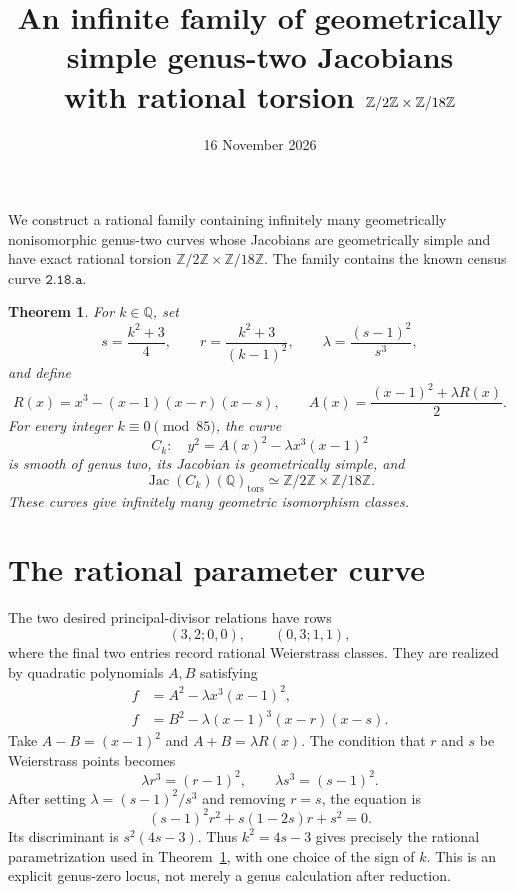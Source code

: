 \documentclass[11pt]{article}
\title{An infinite family of geometrically simple genus-two Jacobians\\
with rational torsion $\Z/2\Z\times\Z/18\Z$}
\author{}
\date{16 November 2026}
\newcommand{\Q}{\mathbb Q}
\newcommand{\Z}{\mathbb Z}
\newcommand{\Jac}{\operatorname{Jac}}
\newtheorem{theorem}{Theorem}
\begin{document}
\maketitle

\noindent
We construct a rational family containing infinitely many geometrically
nonisomorphic genus-two curves whose Jacobians are geometrically simple
and have exact rational torsion $\Z/2\Z\times\Z/18\Z$.
The family contains the known census curve $\texttt{2.18.a}$.

\begin{theorem}\label{thm}
For $k\in\Q$, set
\[
 s=\frac{k^2+3}{4},\qquad
 r=\frac{k^2+3}{(k-1)^2},\qquad
 \lambda=\frac{(s-1)^2}{s^3},
\]
and define
\[
 R(x)=x^3-(x-1)(x-r)(x-s),\qquad
 A(x)=\frac{(x-1)^2+\lambda R(x)}2.
\]
For every integer $k\equiv0\pmod {85}$, the curve
\begin{equation}\label{family}
 C_k:\quad y^2=A(x)^2-\lambda x^3(x-1)^2
\end{equation}
is smooth of genus two, its Jacobian is geometrically simple, and
\[
 \Jac(C_k)(\Q)_{\mathrm{tors}}
 \simeq\Z/2\Z\times\Z/18\Z.
\]
These curves give infinitely many geometric isomorphism classes.
\end{theorem}

\section{The rational parameter curve}
The two desired principal-divisor relations have rows
\[
 (3,2;0,0),\qquad(0,3;1,1),
\]
where the final two entries record rational Weierstrass classes.
They are realized by quadratic polynomials $A,B$ satisfying
\begin{align}
 f&=A^2-\lambda x^3(x-1)^2,\label{norm1}\\
 f&=B^2-\lambda(x-1)^3(x-r)(x-s).\label{norm2}
\end{align}
Take $A-B=(x-1)^2$ and $A+B=\lambda R(x)$. The condition
that $r$ and $s$ be Weierstrass points becomes
\[
 \lambda r^3=(r-1)^2,\qquad
 \lambda s^3=(s-1)^2.
\]
After setting $\lambda=(s-1)^2/s^3$ and removing $r=s$, the equation is
\[
 (s-1)^2r^2+s(1-2s)r+s^2=0.
\]
Its discriminant is $s^2(4s-3)$. Thus $k^2=4s-3$ gives precisely
the rational parametrization used in Theorem~\ref{thm}, with one
choice of the sign of $k$. This is an explicit genus-zero locus,
not merely a genus calculation after reduction.
\end{document}
